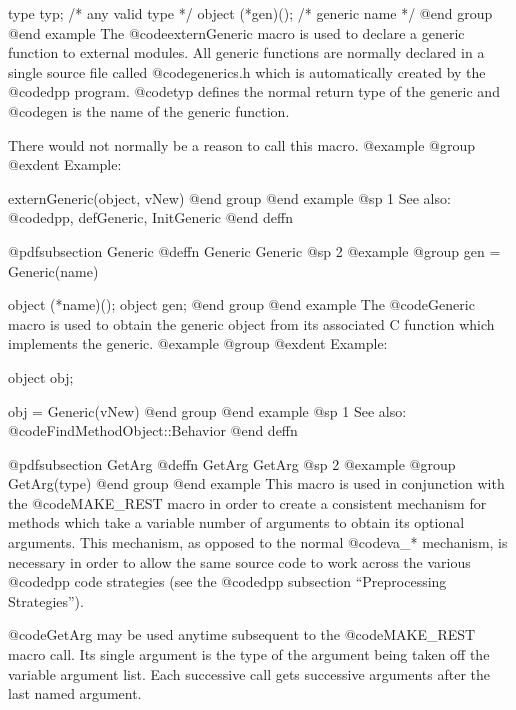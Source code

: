 {{{{type    typ;       /*  any valid type  */
object  (*gen)();  /*  generic name    */
@end group
@end example
The @code{externGeneric} macro is used to declare a generic function to
external modules.  All generic functions are normally declared in a
single source file called @code{generics.h} which is automatically
created by the @code{dpp} program.  @code{typ} defines the normal
return type of the generic and @code{gen} is the name of the generic
function.

There would not normally be a reason to call this macro.
@example
@group
@exdent Example:

externGeneric(object, vNew)
@end group
@end example
@sp 1
See also:  @code{dpp, defGeneric, InitGeneric}
@end deffn










@pdfsubsection {Generic}
@deffn {Generic} Generic
@sp 2
@example
@group
gen = Generic(name)

object  (*name)();
object  gen;
@end group
@end example
The @code{Generic} macro is used to obtain the generic object from its
associated C function which implements the generic.
@example
@group
@exdent Example:

object  obj;

obj = Generic(vNew)
@end group
@end example
@sp 1
See also:  @code{FindMethodObject::Behavior}
@end deffn














@pdfsubsection {GetArg}
@deffn {GetArg} GetArg
@sp 2
@example
@group
GetArg(type)
@end group
@end example
This macro is used in conjunction with the @code{MAKE_REST} macro in order
to create a consistent mechanism for methods which take a variable
number of arguments to obtain its optional arguments.  This mechanism,
as opposed to the normal @code{va_*} mechanism, is necessary in order to
allow the same source code to work across the various @code{dpp} code
strategies (see the @code{dpp} subsection ``Preprocessing Strategies'').

@code{GetArg} may be used anytime subsequent to the @code{MAKE_REST}
macro call.  Its single argument is the type of the argument being
taken off the variable argument list.  Each successive call gets
successive arguments after the last named argument.

}}}}
